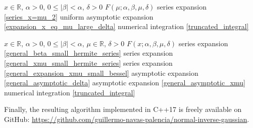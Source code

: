 \documentclass[10pt,a4paper,oneside]{article}
\numberwithin{equation}{section}
\begin{document}
{\centering
\begin{minipage}{.85\linewidth}
  \begin{algorithm}[H]
  \small
  \caption{Algorithm for special case $x=\mu$, $F(\mu; \alpha, \beta, \mu, \delta)$}\label{alg:case_x_eq_mu}
\begin{algorithmic}
\Require $x \in \mathbb{R}$, $\alpha > 0$, $0 \le |\beta| < \alpha$, $\delta > 0$
\Ensure $F(\mu; \alpha, \beta, \mu, \delta)$
    \State series expansion \eqref{series_x=mu_2}
    \State uniform asymptotic expansion \eqref{expansion_x_eq_mu_large_delta}
\Else
	\State numerical integration \eqref{truncated_integral}
\EndIf
\end{algorithmic}
  \end{algorithm}
\end{minipage}
\par
}

{\centering
\begin{minipage}{.85\linewidth}
  \begin{algorithm}[H]
  \small
  \caption{Algorithm for $F(x; \alpha, \beta, \mu, \delta)$}\label{alg:case_general}
\begin{algorithmic}
\Require $x \in \mathbb{R}$, $\alpha > 0$, $0 \le |\beta| < \alpha$, $\mu \in \mathbb{R}$, $\delta > 0$
\Ensure $F(x; \alpha, \beta, \mu, \delta)$
    \State series expansion \eqref{general_beta_small_hermite_series}
    \State series expansion \eqref{general_xmu_small_hermite_series}
	\State series expansion \eqref{general_expansion_xmu_small_bessel}
	\State asymptotic expansion \eqref{general_asymptotic_delta}
	\State asymptotic expansion \eqref{general_asymptotic_xmu}
\Else
	\State numerical integration \eqref{truncated_integral}
\EndIf
\end{algorithmic}
  \end{algorithm}
\end{minipage}
\par
}
\vspace{5mm}
Finally, the resulting algorithm implemented in C++17 is freely available on GitHub: \url{https://github.com/guillermo-navas-palencia/normal-inverse-gaussian}.
\end{document}
